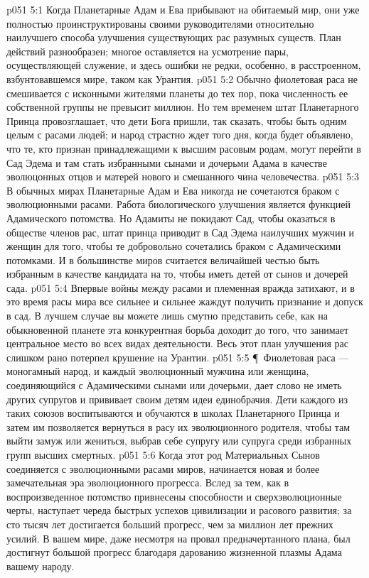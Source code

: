 \vs p051 5:1 Когда Планетарные Адам и Ева прибывают на обитаемый мир, они уже полностью проинструктированы своими руководителями относительно наилучшего способа улучшения существующих рас разумных существ. План действий разнообразен; многое оставляется на усмотрение пары, осуществляющей служение, и здесь ошибки не редки, особенно, в расстроенном, взбунтовавшемся мире, таком как Урантия.
\vs p051 5:2 Обычно фиолетовая раса не смешивается с исконными жителями планеты до тех пор, пока численность ее собственной группы не превысит миллион. Но тем временем штат Планетарного Принца провозглашает, что дети Бога пришли, так сказать, чтобы быть одним целым с расами людей; и народ страстно ждет того дня, когда будет объявлено, что те, кто признан принадлежащими к высшим расовым родам, могут перейти в Сад Эдема и там стать избранными сынами и дочерьми Адама в качестве эволюцонных отцов и матерей нового и смешанного чина человечества.
\vs p051 5:3 В обычных мирах Планетарные Адам и Ева никогда не сочетаются браком с эволюционными расами. Работа биологического улучшения является функцией Адамического потомства. Но Адамиты не покидают Сад, чтобы оказаться в обществе членов рас, штат принца приводит в Сад Эдема наилучших мужчин и женщин для того, чтобы те добровольно сочетались браком с Адамическими потомками. И в большинстве миров считается величайшей честью быть избранным в качестве кандидата на то, чтобы иметь детей от сынов и дочерей сада.
\vs p051 5:4 Впервые войны между расами и племенная вражда затихают, и в это время расы мира все сильнее и сильнее жаждут получить признание и допуск в сад. В лучшем случае вы можете лишь смутно представить себе, как на обыкновенной планете эта конкурентная борьба доходит до того, что занимает центральное место во всех видах деятельности. Весь этот план улучшения рас слишком рано потерпел крушение на Урантии.
\vs p051 5:5 \P\ Фиолетовая раса --- моногамный народ, и каждый эволюционный мужчина или женщина, соединяющийся с Адамическими сынами или дочерьми, дает слово не иметь других супругов и прививает своим детям идеи единобрачия. Дети каждого из таких союзов воспитываются и обучаются в школах Планетарного Принца и затем им позволяется вернуться в расу их эволюционного родителя, чтобы там выйти замуж или жениться, выбрав себе супругу или супруга среди избранных групп высших смертных.
\vs p051 5:6 Когда этот род Материальных Сынов соединяется с эволюционными расами миров, начинается новая и более замечательная эра эволюционного прогресса. Вслед за тем, как в воспроизведенное потомство привнесены способности и сверхэволюционные черты, наступает череда быстрых успехов цивилизации и расового развития; за сто тысяч лет достигается больший прогресс, чем за миллион лет прежних усилий. В вашем мире, даже несмотря на провал предначертанного плана, был достигнут большой прогресс благодаря дарованию жизненной плазмы Адама вашему народу.
